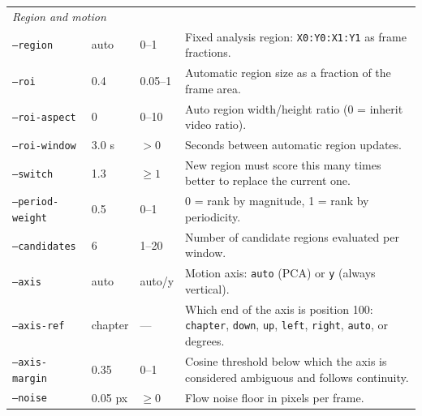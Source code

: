 \documentclass[11pt,a4paper]{article}
\newcommand{\code}[1]{\texttt{#1}}
\begin{document}
\begin{longtable}{p{3.2cm} p{2.2cm} p{1.5cm} p{7.5cm}}
  \multicolumn{4}{l}{\textit{Region and motion}} \\
  \code{--region}        & auto      & 0--1       & Fixed analysis region: \code{X0:Y0:X1:Y1} as frame fractions. \\
  \code{--roi}           & 0.4       & 0.05--1    & Automatic region size as a fraction of the frame area. \\
  \code{--roi-aspect}    & 0         & 0--10      & Auto region width/height ratio (0 = inherit video ratio). \\
  \code{--roi-window}    & 3.0 s     & $>0$       & Seconds between automatic region updates. \\
  \code{--switch}        & 1.3       & $\ge 1$    & New region must score this many times better to replace the current one. \\
  \code{--period-weight} & 0.5       & 0--1       & 0 = rank by magnitude, 1 = rank by periodicity. \\
  \code{--candidates}    & 6         & 1--20      & Number of candidate regions evaluated per window. \\
  \code{--axis}          & auto      & auto/y     & Motion axis: \code{auto} (PCA) or \code{y} (always vertical). \\
  \code{--axis-ref}      & chapter   & ---        & Which end of the axis is position 100: \code{chapter}, \code{down}, \code{up}, \code{left}, \code{right}, \code{auto}, or degrees. \\
  \code{--axis-margin}   & 0.35      & 0--1       & Cosine threshold below which the axis is considered ambiguous and follows continuity. \\
  \code{--noise}         & 0.05 px   & $\ge 0$    & Flow noise floor in pixels per frame. \\


\end{longtable}
\end{document}
